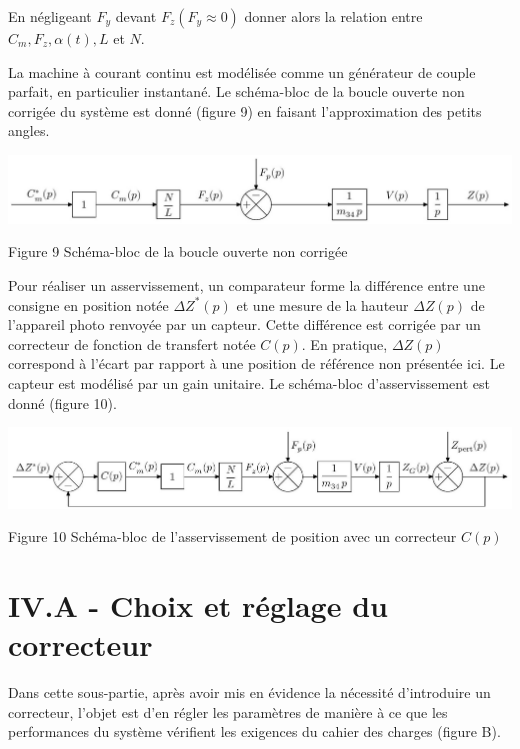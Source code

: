 \documentclass[10pt]{article}
\begin{document}
En négligeant $F_{y}$ devant $F_{z}\left(F_{y} \approx 0\right)$ donner alors la relation entre $C_{m}, F_{z}, \alpha(t), L$ et $N$.

La machine à courant continu est modélisée comme un générateur de couple parfait, en particulier instantané. Le schéma-bloc de la boucle ouverte non corrigée du système est donné (figure 9) en faisant l'approximation des petits angles.

\begin{center}
\includegraphics[max width=\textwidth]{2022_12_31_ed674c1a831ea1bff3a0g-08}
\end{center}

Figure 9 Schéma-bloc de la boucle ouverte non corrigée

Pour réaliser un asservissement, un comparateur forme la différence entre une consigne en position notée $\Delta Z^{*}(p)$ et une mesure de la hauteur $\Delta Z(p)$ de l'appareil photo renvoyée par un capteur. Cette différence est corrigée par un correcteur de fonction de transfert notée $C(p)$. En pratique, $\Delta Z(p)$ correspond à l'écart par rapport à une position de référence non présentée ici. Le capteur est modélisé par un gain unitaire. Le schéma-bloc d'asservissement est donné (figure 10).

\begin{center}
\includegraphics[max width=\textwidth]{2022_12_31_ed674c1a831ea1bff3a0g-08(1)}
\end{center}

Figure 10 Schéma-bloc de l'asservissement de position avec un correcteur $C(p)$

\section{IV.A - Choix et réglage du correcteur}
Dans cette sous-partie, après avoir mis en évidence la nécessité d'introduire un correcteur, l'objet est d'en régler les paramètres de manière à ce que les performances du système vérifient les exigences du cahier des charges (figure B).
\end{document}
